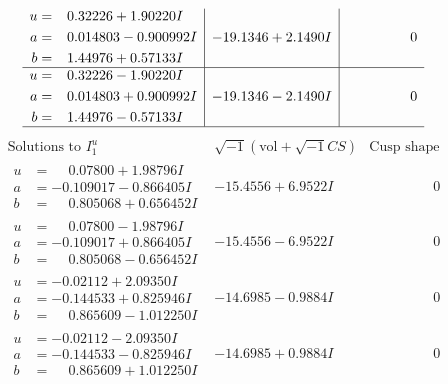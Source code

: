 \documentclass[1p]{elsarticle_modified}
\theoremstyle{definition}
\newcommand{\I}{\sqrt{-1}}
\begin{document}
$$\begin{array}{c|c|c}
\begin{aligned}
u &= \phantom{-}0.32226 + 1.90220 I \\
a &= \phantom{-}0.014803 - 0.900992 I \\
b &= \phantom{-}1.44976 + 0.57133 I\end{aligned}
 & -19.1346 + 2.1490 I & \phantom{-0.000000 } 0 \\ \hline\begin{aligned}
u &= \phantom{-}0.32226 - 1.90220 I \\
a &= \phantom{-}0.014803 + 0.900992 I \\
b &= \phantom{-}1.44976 - 0.57133 I\end{aligned}
 & -19.1346 - 2.1490 I & \phantom{-0.000000 } 0\\
 \hline 
 \end{array}$$\newpage$$\begin{array}{c|c|c}  
\text{Solutions to }I^u_{1}& \I (\text{vol} + \sqrt{-1}CS) & \text{Cusp shape}\\
 \hline 
\begin{aligned}
u &= \phantom{-}0.07800 + 1.98796 I \\
a &= -0.109017 - 0.866405 I \\
b &= \phantom{-}0.805068 + 0.656452 I\end{aligned}
 & -15.4556 + 6.9522 I & \phantom{-0.000000 } 0 \\ \hline\begin{aligned}
u &= \phantom{-}0.07800 - 1.98796 I \\
a &= -0.109017 + 0.866405 I \\
b &= \phantom{-}0.805068 - 0.656452 I\end{aligned}
 & -15.4556 - 6.9522 I & \phantom{-0.000000 } 0 \\ \hline\begin{aligned}
u &= -0.02112 + 2.09350 I \\
a &= -0.144533 + 0.825946 I \\
b &= \phantom{-}0.865609 - 1.012250 I\end{aligned}
 & -14.6985 - 0.9884 I & \phantom{-0.000000 } 0 \\ \hline\begin{aligned}
u &= -0.02112 - 2.09350 I \\
a &= -0.144533 - 0.825946 I \\
b &= \phantom{-}0.865609 + 1.012250 I\end{aligned}
 & -14.6985 + 0.9884 I & \phantom{-0.000000 } 0 \\ \hline\begin{aligned}

\end{aligned}
\end{array}$$
\end{document}
